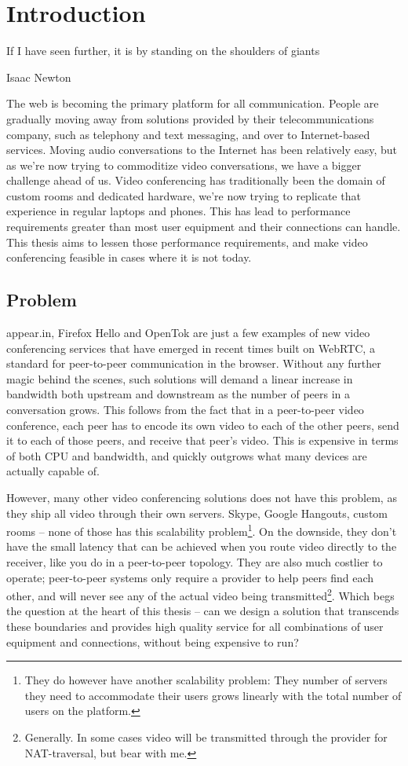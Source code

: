\chapter{Introduction}\label{chp:introduction}

\epigraph{If I have seen further, it is by standing on the shoulders of giants}{Isaac Newton}

The web is becoming the primary platform for all communication. People are gradually moving away from solutions provided by their telecommunications company, such as telephony and text messaging, and over to Internet-based services. Moving audio conversations to the Internet has been relatively easy, but as we're now trying to commoditize video conversations, we have a bigger challenge ahead of us. Video conferencing has traditionally been the domain of custom rooms and dedicated hardware, we're now trying to replicate that experience in regular laptops and phones. This has lead to performance requirements greater than most user equipment and their connections can handle. This thesis aims to lessen those performance requirements, and make video conferencing feasible in cases where it is not today.


\section{Problem}

appear.in, Firefox Hello and OpenTok are just a few examples of new video conferencing services that have emerged in recent times built on WebRTC, a standard for peer-to-peer communication in the browser. Without any further magic behind the scenes, such solutions will demand a linear increase in bandwidth both upstream and downstream as the number of peers in a conversation grows. This follows from the fact that in a peer-to-peer video conference, each peer has to encode its own video to each of the other peers, send it to each of those peers, and receive that peer's video. This is expensive in terms of both CPU and bandwidth, and quickly outgrows what many devices are actually capable of.

However, many other video conferencing solutions does not have this problem, as they ship all video through their own servers. Skype, Google Hangouts, custom rooms -- none of those has this scalability problem\footnote{They do however have another scalability problem: They number of servers they need to accommodate their users grows linearly with the total number of users on the platform.}. On the downside, they don't have the small latency that can be achieved when you route video directly to the receiver, like you do in a peer-to-peer topology. They are also much costlier to operate; peer-to-peer systems only require a provider to help peers find each other, and will never see any of the actual video being transmitted\footnote{Generally. In some cases video will be transmitted through the provider for NAT-traversal, but bear with me.}. Which begs the question at the heart of this thesis -- can we design a solution that transcends these boundaries and provides high quality service for all combinations of user equipment and connections, without being expensive to run?

